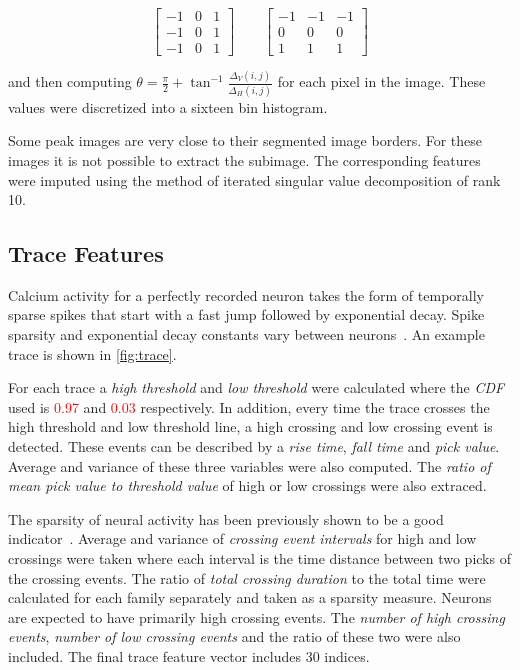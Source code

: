\documentclass[10pt]{article}
\newcommand{\todo}[1]{\textcolor{red}{#1}}
\begin{document}
$$
\begin{bmatrix}
-1 & 0 & 1 \\ -1 & 0 & 1 \\ -1 & 0 & 1
\end{bmatrix} \qquad
\begin{bmatrix}
-1 & -1 & -1 \\
0 & 0 & 0 \\
1 & 1 & 1
\end{bmatrix}
$$

\noindent
and then computing $\theta = \frac{\pi}{2} + \tan^{-1}\frac{\Delta_V(i,j)}{\Delta_H(i,j)}$ for each pixel in the image.
These values were discretized into a sixteen bin histogram.

Some peak images are very close to their segmented image borders. For these images it is not possible to extract the subimage.
The corresponding features were imputed using the method of iterated singular value decomposition of rank \num{10}.

\subsection{Trace Features}

Calcium activity for a perfectly recorded neuron takes the form of temporally sparse spikes that start with a fast jump followed by exponential decay. Spike sparsity and exponential decay constants vary between neurons~\cite{Mukamel2009}. 
An example trace is shown in \cref{fig:trace}.

For each trace a \emph{high threshold} and \emph{low threshold} were calculated where the \emph{CDF} used is \todo{\num{0.97}} and \todo{\num{0.03}} respectively. In addition, every time the trace crosses the high threshold and low threshold line, a high crossing and low crossing event is detected. These events can be described by a \emph{rise time}, \emph{fall time} and \emph{pick value}. Average and variance of these three variables were also computed. The \emph{ratio of mean pick value to threshold value} of high or low crossings were also extraced.

The sparsity of neural activity has been previously shown to be a good indicator~\cite{Kim2011}. Average and variance of \emph{crossing event intervals} for high and low crossings were taken where each interval is the time distance between two picks of the crossing events.  The ratio of \emph{total crossing duration} to the total time were calculated for each family separately and taken as a sparsity measure. Neurons are expected to have primarily high crossing events. The \emph{number of high crossing events}, \emph{number of low crossing events} and the ratio of these two were also included. The final trace feature vector includes \num{30} indices.
\end{document}
